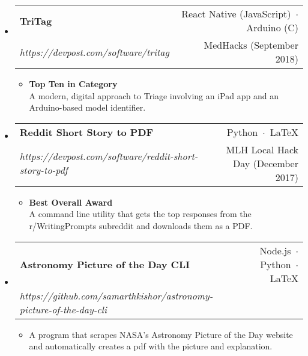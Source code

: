 \documentclass[10pt]{article}
\makeatletter
\newcommand{\resumeSubHeadingListStart}{\begin{itemize}[leftmargin=*]}
\newcommand{\resumeSubHeadingListEnd}{\end{itemize}\vspace{-2em}}
\newcommand{\workSubheading}[5]{
\setlength\itemsep{-0.25em}
\item
\begin{tabular*}{\textwidth}{l@{\extracolsep{\fill}}r}
\textbf{\large#1} & {\small #2} \\
\textit{#3} & {#4}
\end{tabular*}
\vspace{-1.25em}
\begin{itemize}
\item #5
\end{itemize}}
\makeatother
\begin{document}
\resumeSubHeadingListStart{}

\workSubheading{TriTag}{React Native (JavaScript)\ $\cdotp$\ Arduino (C)}
{https://devpost.com/software/tritag}{MedHacks (September 2018)}
{\textbf{Top Ten in Category}\\ A modern, digital approach to Triage involving an iPad app and an Arduino-based model identifier.}

\workSubheading{Reddit Short Story to PDF}{Python\ $\cdotp$\ \LaTeX}
{https://devpost.com/software/reddit-short-story-to-pdf}{MLH Local Hack Day (December 2017)}
{\textbf{Best Overall Award}\\ A command line utility that gets the top responses from the r/WritingPrompts subreddit and downloads them as a PDF.}

\workSubheading{Astronomy Picture of the Day CLI}{Node.js\ $\cdotp$\ Python\ $\cdotp$\ \LaTeX}
{https://github.com/samarthkishor/astronomy-picture-of-the-day-cli}{}
{A program that scrapes NASA's Astronomy Picture of the Day website and automatically creates a pdf with the picture and explanation.}

\resumeSubHeadingListEnd{}






\end{document}
